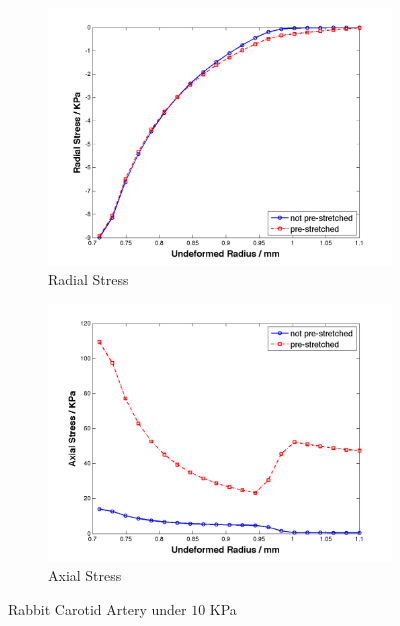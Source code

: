 \begin{figure}[H]
	\begin{subfigure}[b]{0.5\textwidth}
		\centering
		\includegraphics[width=\textwidth]{./figures/artery_radial.png}
		\caption{Radial Stress}
		\label{radial_artery}
	\end{subfigure}
	\begin{subfigure}[b]{0.5\textwidth}
		\centering
		\includegraphics[width=\textwidth]{./figures/artery_axial.png}
		\caption{Axial Stress}
		\label{axial_artery}
	\end{subfigure}
	\caption{Rabbit Carotid Artery under $10$ KPa}
	\label{fig:artery}
\end{figure}

















